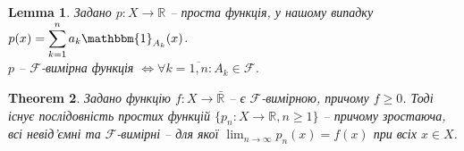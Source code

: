 \documentclass[a4paper, 10pt]{article}
\theoremstyle{theoremdd}
\newtheorem{theorem}{Theorem}[subsection]
\newtheorem{lemma}[theorem]{Lemma}
\begin{document}
\begin{lemma}
Задано $p \colon X \to \mathbb{R}$ -- проста функція, у нашому випадку $p(x) = \displaystyle\sum_{k=1}^n a_k \mathbbm{1}_{A_k}(x)$.\\
$p$ -- $\mathcal{F}$-вимірна функція $\iff \forall k = \overline{1,n}: A_k \in \mathcal{F}$.
\end{lemma}

\begin{theorem}
Задано функцію $f \colon X \to \bar{\mathbb{R}}$ -- є $\mathcal{F}$-вимірною, причому $f \geq 0$. Тоді існує послідовність простих функцій $\{p_n \colon X \to \mathbb{R}, n \geq 1\}$ -- причому зростаюча, всі невід'ємні та $\mathcal{F}$-вимірні -- для якої $\displaystyle\lim_{n \to \infty} p_n(x) = f(x)$ при всіх $x \in X$.
\end{theorem}
\end{document}
